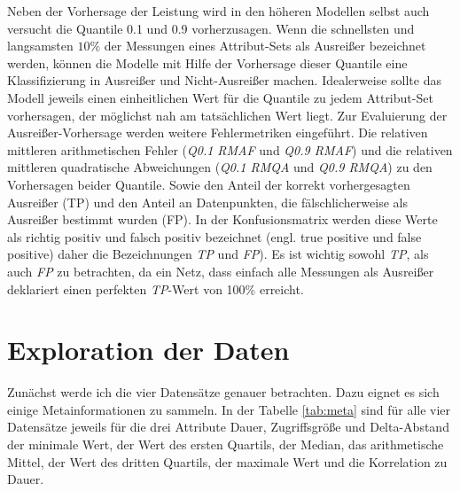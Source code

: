 \documentclass[
	12pt,
	a4paper,
	BCOR10mm,
	DIV14,
	listof=totoc,
	bibliography=totoc,
	headsepline
]{scrreprt}
\begin{document}
Neben der Vorhersage der Leistung wird in den höheren Modellen selbst auch versucht die Quantile 0.1 und 0.9 vorherzusagen.
Wenn die schnellsten und langsamsten $10\%$ der Messungen eines Attribut-Sets als Ausreißer bezeichnet werden, können die Modelle mit Hilfe der Vorhersage dieser Quantile eine Klassifizierung in Ausreißer und Nicht-Ausreißer machen.
Idealerweise sollte das Modell jeweils einen einheitlichen Wert für die Quantile zu jedem Attribut-Set vorhersagen, der möglichst nah am tatsächlichen Wert liegt.
Zur Evaluierung der Ausreißer-Vorhersage werden weitere Fehlermetriken eingeführt.
Die relativen mittleren arithmetischen Fehler (\textit{Q0.1 RMAF} und \textit{Q0.9 RMAF}) und die relativen mittleren quadratische Abweichungen (\textit{Q0.1 RMQA} und \textit{Q0.9 RMQA}) zu den Vorhersagen beider Quantile.
Sowie den Anteil der korrekt vorhergesagten Ausreißer (TP) und den Anteil an Datenpunkten, die fälschlicherweise als Ausreißer bestimmt wurden (FP).
In der Konfusionsmatrix werden diese Werte als richtig positiv und falsch positiv bezeichnet (engl. true positive und false positive) daher die Bezeichnungen \textit{TP} und \textit{FP}).
Es ist wichtig sowohl \textit{TP}, als auch \textit{FP} zu betrachten, da ein Netz, dass einfach alle Messungen als Ausreißer deklariert einen perfekten \textit{TP}-Wert von 100\% erreicht.

\section{Exploration der Daten}
\label{exploration}
Zunächst werde ich die vier Datensätze genauer betrachten. Dazu eignet es sich einige Metainformationen zu sammeln.
In der Tabelle \ref{tab:meta} sind für alle vier Datensätze jeweils für die drei Attribute Dauer, Zugriffsgröße und Delta-Abstand der minimale Wert, der Wert des ersten Quartils, der Median, das arithmetische Mittel, der Wert des dritten Quartils, der maximale Wert und die Korrelation zu Dauer.
\end{document}
